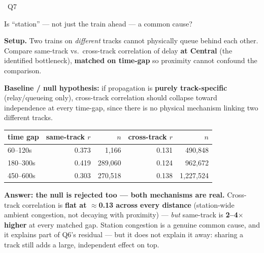 \documentclass[aspectratio=169,10pt]{beamer}
\newcommand{\hl}[1]{{\color{corange}\textbf{#1}}}
\newcommand{\qtag}[1]{{\scriptsize\color{surface}\colorbox{cblue}{\strut~Q#1~}}}
\begin{document}
\begin{frame}{\qtag{7} Is ``station'' --- not just the train ahead --- a common cause?}
  \textbf{Setup.} Two trains on \emph{different} tracks cannot physically queue
  behind each other. Compare same-track vs.\ cross-track correlation of delay
  \textbf{at Central} (the identified bottleneck), \textbf{matched on time-gap}
  so proximity cannot confound the comparison.

  \vspace{0.4em}
  \textbf{Baseline / null hypothesis:} if propagation is \textbf{purely
  track-specific} (relay/queueing only), cross-track correlation should collapse
  toward independence at every time-gap, since there is no physical mechanism
  linking two different tracks.

  \vspace{0.5em}
  \centering
  \begin{tabular}{@{}lrrrr@{}}
    \toprule
    time gap & same-track $r$ & $n$ & cross-track $r$ & $n$ \\
    \midrule
    60--120s & 0.373 & 1{,}166 & 0.131 & 490{,}848 \\
    180--300s & 0.419 & 289{,}060 & 0.124 & 962{,}672 \\
    450--600s & 0.303 & 270{,}518 & 0.138 & 1{,}227{,}524 \\
    \bottomrule
  \end{tabular}

  \vspace{0.6em}
  \textbf{Answer: the null is rejected too --- both mechanisms are real.}
  Cross-track correlation is \hl{flat at $\approx$0.13 across every distance}
  (station-wide ambient congestion, not decaying with proximity) --- \emph{but}
  same-track is \textbf{2--4$\times$ higher} at every matched gap. Station
  congestion is a genuine common cause, and it explains part of Q6's residual ---
  but it does not explain it away: sharing a track still adds a large,
  independent effect on top.
\end{frame}
\end{document}
